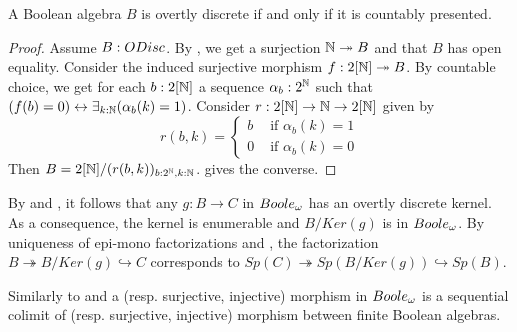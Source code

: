 \begin{corollary}\label{ODiscBAareBoole}
  A Boolean algebra $B$ is overtly discrete if and only if it is countably presented. 
\end{corollary}
\begin{proof}
  Assume $B:\ODisc$. 
  By , we get a surjection $\mathbb{N}\twoheadrightarrow B$ and that $B$ has open equality. 
  Consider the induced surjective morphism $f:2[\mathbb{N}]\twoheadrightarrow B$.
  By countable choice, we get for each $b:2[\mathbb{N}]$
  a sequence $\alpha_{b}:2^{\mathbb{N}}$ such that 
  $(f(b) = 0)\leftrightarrow \exists_{k:\mathbb{N}} (\alpha_{b}(k) =1)$. 
  Consider 
  $r:2[\mathbb{N}] \to \mathbb{N} \to 2[\mathbb{N}]$ 
  given by 
  \[r(b,k) =\begin{cases}
    b &\text{ if } \alpha_{b}(k) = 1\\
    0   &\text{ if } \alpha_{b}(k) = 0
  \end{cases}
  \] 
  Then $B= 2[\mathbb{N}]/(r(b,k))_{b:2^{\mathbb{N}},k:\mathbb{N}}$.
   gives the converse.
\end{proof}

\begin{remark}\label{BooleEpiMono}
  By  and , 
  it follows that any 
  $g:B\to C$ in $\Boole$ has an overtly discrete kernel.
  As a consequence, the kernel is enumerable and $B/Ker(g)$ is in $\Boole$. 
  By uniqueness of epi-mono factorizations and , 
  the factorization 
  $B\twoheadrightarrow B/Ker(g) \hookrightarrow C$ corresponds to 
  $Sp(C) \twoheadrightarrow Sp(B/Ker(g)) \hookrightarrow Sp(B)$. 
\end{remark}
\begin{remark}\label{decompositionBooleMaps}
  Similarly to  and 
   a (resp. surjective, injective) morphism
  in $\Boole$ is a sequential colimit of (resp. surjective, injective) morphism between 
  finite Boolean algebras.
\end{remark}

